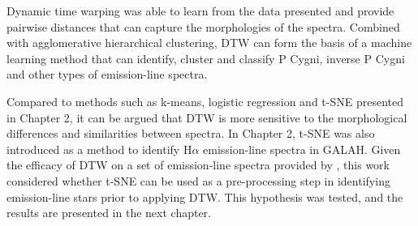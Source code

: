 Dynamic time warping was able to learn from the data presented and provide pairwise distances that can capture the morphologies of the spectra. Combined with agglomerative hierarchical clustering, DTW can form the basis of a machine learning method that can identify, cluster and classify P Cygni, inverse P Cygni and other types of emission-line spectra.

Compared to methods such as k-means, logistic regression and t-SNE presented in Chapter 2, it can be argued that DTW is more sensitive to the morphological differences and similarities between spectra. In Chapter 2, t-SNE was also introduced as a method to identify H$\alpha$ emission-line spectra in GALAH. Given the efficacy of DTW on a set of emission-line spectra provided by \citet{vcotar2021galah}, this work considered whether t-SNE can be used as a pre-processing step in identifying emission-line stars prior to applying DTW. This hypothesis was tested, and the results are presented in the next chapter. 








